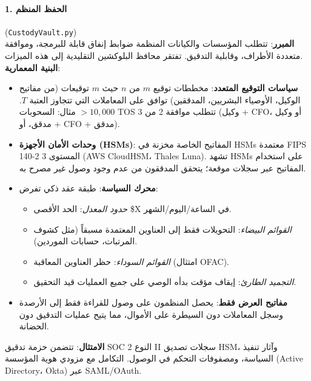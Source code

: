 \documentclass[11pt]{article}
\begin{document}
\paragraph{1. الحفظ المنظم} (\texttt{CustodyVault.py})\\
\textbf{المبرر}: تتطلب المؤسسات والكيانات المنظمة ضوابط إنفاق قابلة للبرمجة، وموافقة متعددة الأطراف، وقابلية التدقيق. تفتقر محافظ البلوكشين التقليدية إلى هذه الميزات.\\
\textbf{البنية المعمارية}:
\begin{itemize}[noitemsep]
  \item \textbf{سياسات التوقيع المتعدد}: مخططات توقيع $m$ من $n$ حيث $m$ توقيعات (من مفاتيح الوكيل، الأوصياء البشريين، المدققين) توافق على المعاملات التي تتجاوز العتبة $T$. مثال: السحوبات $>10,000$ TOS تتطلب موافقة 2 من 3 (وكيل + CFO، أو وكيل + مدقق، أو CFO + مدقق).
  \item \textbf{وحدات الأمان الأجهزة (HSMs)}: المفاتيح الخاصة مخزنة في HSMs معتمدة FIPS 140-2 المستوى 3 (AWS CloudHSM، Thales Luna). تشهد HSMs على استخدام المفاتيح عبر سجلات موقعة؛ يتحقق المدققون من عدم وجود وصول غير مصرح به.
  \item \textbf{محرك السياسة}: طبقة عقد ذكي تفرض:
    \begin{itemize}[noitemsep]
      \item \emph{حدود المعدل}: الحد الأقصى \$X في الساعة/اليوم/الشهر.
      \item \emph{القوائم البيضاء}: التحويلات فقط إلى العناوين المعتمدة مسبقاً (مثل كشوف المرتبات، حسابات الموردين).
      \item \emph{القوائم السوداء}: حظر العناوين المعاقبة (امتثال OFAC).
      \item \emph{التجميد الطارئ}: إيقاف مؤقت بدأه الوصي على جميع العمليات قيد التحقيق.
    \end{itemize}
  \item \textbf{مفاتيح العرض فقط}: يحصل المنظمون على وصول للقراءة فقط إلى الأرصدة وسجل المعاملات دون السيطرة على الأموال، مما يتيح عمليات التدقيق دون الحضانة.
\end{itemize}
\textbf{الامتثال}: تتضمن حزمة تدقيق SOC 2 النوع II سجلات تصديق HSM، وآثار تنفيذ السياسة، ومصفوفات التحكم في الوصول. التكامل مع مزودي هوية المؤسسة (Active Directory، Okta) عبر SAML/OAuth.
\end{document}
